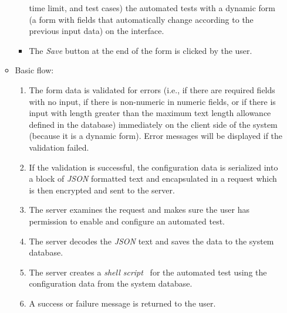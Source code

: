 \begin{enumerate}
\begin{itemize}
\begin{itemize}
                time limit, and
                test cases) the automated tests with a dynamic form (a form
                with fields that automatically change according to the previous
                input data) on the
                interface.
            \item The \emph{Save} button at the end of the form is clicked by
                the user.
        \end{itemize}
    \item Basic flow:
        \begin{enumerate}
            \item The form data is validated for errors
                (i.e., if there are required fields with no input,
                if there is non-numeric
                in numeric fields, or if there is input with length greater
                than the maximum text length allowance defined in the database)
                immediately on the client side of the system (because it is a
                dynamic form). Error messages
                will be displayed if the validation failed.
            \item If the validation is successful, the configuration data is
                serialized into a block of \emph{JSON} \cite{JSON} formatted text and
                encapsulated in a request which is then encrypted and sent to
                the server.
            \item The server examines the request and makes sure the user has
                permission to enable and configure an automated test.
            \item The server decodes the \emph{JSON} text and saves the data to
                the system database.
            \item The server creates a \emph{shell script}~\cite[Chapter 3]{shellScript}
                for the automated test using the configuration data from the
                system database.
            \item A success or failure message is returned to the user.
        \end{enumerate}
\end{itemize}


\end{enumerate}
